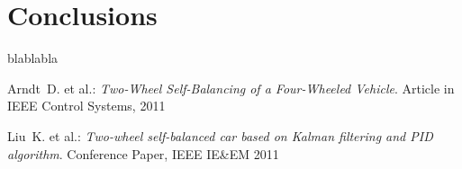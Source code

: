 \documentclass[conference]{IEEEtran}
\begin{document}
\section{Conclusions}

blablabla

 
 
 
\begin{thebibliography}{1}

 {\sc Arndt~D. et al.}: {\it Two-Wheel Self-Balancing of a Four-Wheeled Vehicle}. Article in IEEE Control Systems, 2011

 {\sc Liu~K. et al.}: {\it Two-wheel self-balanced car based on Kalman filtering and PID algorithm}. Conference Paper, IEEE IE\&EM 2011


\end{thebibliography}


\end{document}
